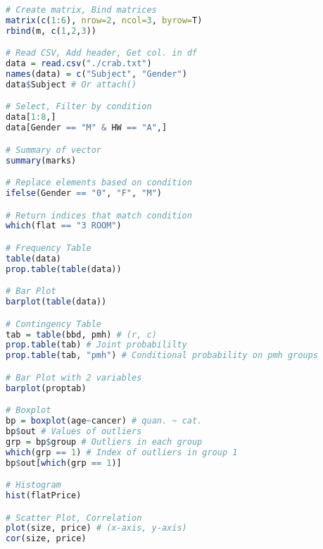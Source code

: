 \documentclass{article}
\begin{document}
\begin{multicols*}{4}
\begin{lstlisting}[language=R, breaklines=true]
# Create matrix, Bind matrices
matrix(c(1:6), nrow=2, ncol=3, byrow=T)
rbind(m, c(1,2,3))

# Read CSV, Add header, Get col. in df
data = read.csv("./crab.txt")
names(data) = c("Subject", "Gender")
data$Subject # Or attach()

# Select, Filter by condition
data[1:8,]
data[Gender == "M" & HW == "A",]

# Summary of vector
summary(marks)

# Replace elements based on condition
ifelse(Gender == "0", "F", "M")

# Return indices that match condition
which(flat == "3 ROOM")

# Frequency Table
table(data)
prop.table(table(data))

# Bar Plot
barplot(table(data))

# Contingency Table 
tab = table(bbd, pmh) # (r, c)
prop.table(tab) # Joint probabililty
prop.table(tab, "pmh") # Conditional probability on pmh groups

# Bar Plot with 2 variables
barplot(proptab)

# Boxplot
bp = boxplot(age~cancer) # quan. ~ cat.
bp$out # Values of outliers
grp = bp$group # Outliers in each group
which(grp == 1) # Index of outliers in group 1
bp$out[which(grp == 1)] 

# Histogram
hist(flatPrice)

# Scatter Plot, Correlation
plot(size, price) # (x-axis, y-axis)
cor(size, price)

\end{lstlisting}

\end{multicols*}
\end{document}
